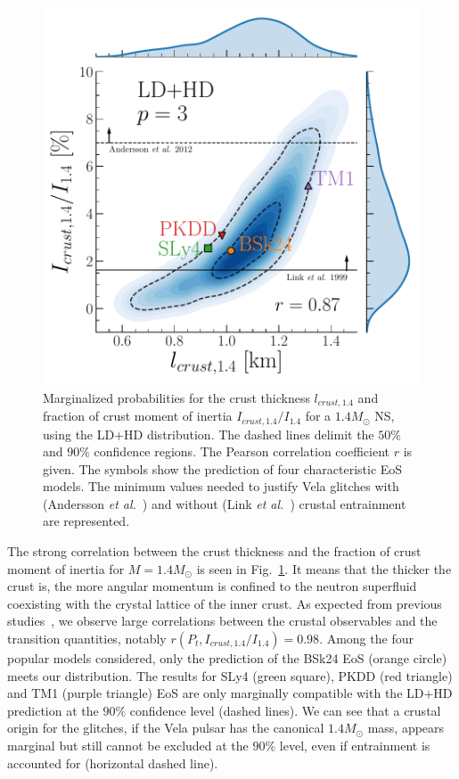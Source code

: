 \begin{figure}[!t]
  \begin{center}
    \includegraphics[width=0.8\linewidth]{figures/ifrac14_vs_lcrust14.pdf}
  \end{center}
  \caption[Marginalized probabilities for the crust thickness and fraction of
  crust moment of inertia of a $1.4M_\odot$ neutron star]{Marginalized 
    probabilities for the crust thickness $l_{crust,1.4}$ and fraction of crust 
    moment of inertia $I_{crust,1.4}/I_{1.4}$ for a $1.4M_\odot$ NS, using the 
    LD+HD distribution. The dashed lines delimit the $50\%$ and $90\%$ 
    confidence regions. The Pearson correlation coefficient $r$ is given. The 
    symbols show the prediction of four characteristic EoS 
    models. The minimum values needed to justify Vela glitches with (Andersson 
    \textit{et al.}~\cite{Andersson2012}) and without (Link \textit{et
  al.}~\cite{Link1999}) crustal entrainment are 
represented.}\label{fig:ifrac14_vs_lcrust14}
\end{figure}

The strong correlation between the crust thickness and the fraction of crust 
moment of inertia for $M=1.4M_\odot$ is seen in
Fig.~\ref{fig:ifrac14_vs_lcrust14}. It means that the thicker the crust is, 
the more angular momentum is confined to the neutron superfluid coexisting with 
the crystal lattice of the inner crust. 
As expected from previous studies~\cite{Piekarewicz2014,Carreau2019moi}, we 
observe large correlations between the crustal observables and the transition 
quantities, notably $r(P_t,I_{crust,1.4}/I_{1.4})=0.98$. Among the four popular 
models considered, only the prediction of the BSk24 EoS (orange circle) meets 
our distribution. The results for SLy4 (green square), PKDD (red triangle) and 
TM1 (purple triangle) EoS are only marginally compatible with the LD+HD 
prediction at the $90\%$ confidence level (dashed lines).
%
We can see that a crustal origin for the glitches, if the Vela pulsar has the
canonical $1.4M_\odot$ mass, appears marginal but still cannot be excluded at
the $90\%$ level, even if entrainment is accounted for (horizontal dashed
line).

